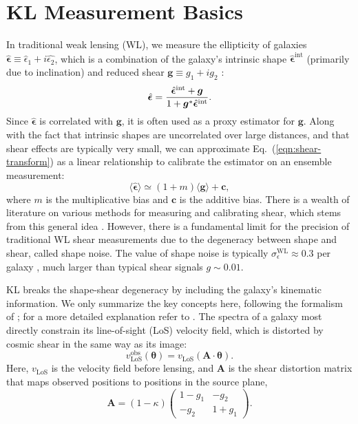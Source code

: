 \section{KL Measurement Basics}
\label{sec:kl-basics}

In traditional weak lensing (WL), we measure the ellipticity of galaxies $\hat{\bm{\epsilon}}\equiv\hat{\epsilon}_1+i\hat{\epsilon_2}$, which is a combination of the galaxy's intrinsic shape $\hat{\bm{\epsilon}}^\mathrm{int}$ (primarily due to inclination) and reduced shear $\bm{g}\equiv g_1+ig_2$ \citep{WL2001}:
\begin{equation}
\label{eqn:shear-transform}
    \hat{\bm{\epsilon}} = \frac{\hat{\bm{\epsilon}}^{\mathrm{int}}+\bm{g}}{1+\bm{g}^*\hat{\bm{\epsilon}}^\mathrm{int}}.
\end{equation}
Since $\hat{\bm{\epsilon}}$ is correlated with $\bm{g}$, it is often used as a proxy estimator for $\bm{g}$. Along with the fact that intrinsic shapes are uncorrelated over large distances, and that shear effects are typically very small, we can approximate Eq.~(\ref{eqn:shear-transform}) as a linear relationship to calibrate the estimator on an ensemble measurement:
\begin{equation}
\label{eqn:linear-bias}
    \langle\hat{\bm{\epsilon}}\rangle \simeq (1+m)\langle\bm{g}\rangle + \mathbf{c},
\end{equation}
where $m$ is the multiplicative bias and $\mathbf{c}$ is the additive bias. There is a wealth of literature on various methods for measuring and calibrating shear, which stems from this general idea \citep{Hirata2003, Metacal, Metadet, Anacal}. However, there is a fundamental limit for the precision of traditional WL shear measurements due to the degeneracy between shape and shear, called shape noise. The value of shape noise is typically $\sigma_\epsilon^\mathrm{WL} \approx 0.3$ per galaxy \citep{Bernstein2002}, much larger than typical shear signals $g \sim 0.01$.

KL breaks the shape-shear degeneracy by including the galaxy's kinematic information. We only summarize the key concepts here, following the formalism of \citep{KLRoman, KLDESI}; for a more detailed explanation refer to \citep{KL, KLInferenceI, KLRoman}. The spectra of a galaxy most directly constrain its line-of-sight (LoS) velocity field, which is distorted by cosmic shear in the same way as its image:
\begin{equation}
\label{eqn:shear-vfield}
    v_\mathrm{LoS}^\mathrm{obs}(\bm{\theta}) = v_\mathrm{LoS}(\textbf{A}\cdot\bm{\theta}).
\end{equation}
Here, $v_\mathrm{LoS}$ is the velocity field before lensing, and $\textbf{A}$ is the shear distortion matrix that maps observed positions to positions in the source plane,
\begin{equation}
\label{eqn:shear-mat}
     \textbf{A}=
    (1-\kappa)\begin{pmatrix}
    1-g_1 & -g_2 \\
    -g_2 & 1+g_1
    \end{pmatrix}.
\end{equation}

